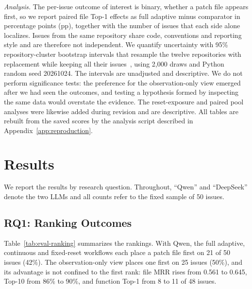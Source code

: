 \documentclass[a4paper,fleqn]{cas-sc}
\begin{document}
\emph{Analysis.} The per-issue outcome of interest is binary, whether a patch file appears first, so we report paired file Top-1 effects as full adaptive minus comparator in percentage points (pp), together with the number of issues that each side alone localizes. Issues from the same repository share code, conventions and reporting style and are therefore not independent. We quantify uncertainty with 95\% repository-cluster bootstrap intervals that resample the twelve repositories with replacement while keeping all their issues~\citep{efron1993,clusterbootstrap2007}, using 2,000 draws and Python random seed 20261024. The intervals are unadjusted and descriptive. We do not perform significance tests: the preference for the observation-only view emerged after we had seen the outcomes, and testing a hypothesis formed by inspecting the same data would overstate the evidence. The reset-exposure and paired pool analyses were likewise added during revision and are descriptive. All tables are rebuilt from the saved scores by the analysis script described in Appendix~\ref{app:reproduction}.

\section{Results}\label{sec:results}
We report the results by research question. Throughout, ``Qwen'' and ``DeepSeek'' denote the two LLMs and all counts refer to the fixed sample of 50 issues.

\subsection{RQ1: Ranking Outcomes}\label{sec:rq1}
Table~\ref{tab:eval-ranking} summarizes the rankings. With Qwen, the full adaptive, continuous and fixed-reset workflows each place a patch file first on 21 of 50 issues (42\%). The observation-only view places one first on 25 issues (50\%), and its advantage is not confined to the first rank: file MRR rises from 0.561 to 0.645, Top-10 from 86\% to 90\%, and function Top-1 from 8 to 11 of 48 issues.
\end{document}
